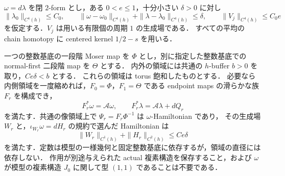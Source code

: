 \begin{proposition}
\label{ke:quantitative-order-hamiltonian}
$\omega=d\lambda$ を閉 $2$-form とし，ある $0<e\le1$，十分小さい $\delta>0$ に対し
\begin{equation}\label{ke:eq:order-primitive-input}
 \|\lambda_0\|_{C^4(h)}\le C_0,\qquad
 \|\omega-\omega_0\|_{C^4(h)}+
 \|\lambda-\lambda_0\|_{C^4(h)}\le\delta,\qquad
 \|V_j\|_{C^4(h)}\le C_0 e
\end{equation}
を仮定する．$V_j$ は用いる有限個の周期 $1$ の生成場である．
すべての平均の chain homotopy に centered kernel $1/2-s$ を用いる．

一つの整数基底の一段階 Moser map を $\Phi$ とし，別に指定した整数基底での
normal-first 二段階 map を $\Theta$ とする．
内外の領域には共通の $h$-buffer $b>0$ を取り，$Ce\delta<b$ とする．
これらの領域は torus 飽和したものとする．
必要なら内側領域を一度縮めれば，$F_0=\Phi$，$F_1=\Theta$ である
endpoint maps の滑らかな族 $F_r$ を構成でき，
\[
 F_r^*\omega=\mathcal A\omega,\qquad
 F_r^*\lambda=\mathcal A\lambda+dQ_r
\]
を満たす．共通の像領域上で $\Psi_r=F_r\Phi^{-1}$ は $\omega$-Hamiltonian であり，
その生成場 $W_r$ と，$\iota_{W_r}\omega=dH_r$ の規約で選んだ Hamiltonian は
\begin{equation}\label{ke:eq:order-hamiltonian-bound}
 \|W_r\|_{C^1(h)}+\|H_r\|_{C^2(h)}\le C e\delta
\end{equation}
を満たす．定数は模型の一様幾何と固定整数基底に依存するが，領域の直径には依存しない．
作用が別途与えられた actual 複素構造を保存すること，および
$\omega$ が模型の複素構造 $J_0$ に関して型 $(1,1)$ であることは不要である．
\end{proposition}

